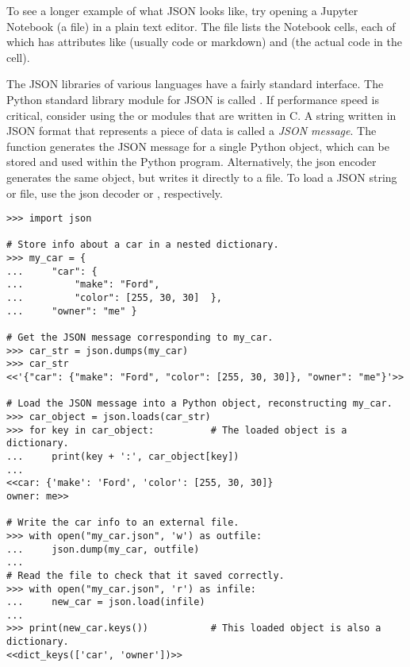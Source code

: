 \begin{info}
To see a longer example of what JSON looks like, try opening a Jupyter Notebook (a  file) in a plain text editor.
The file lists the Notebook cells, each of which has attributes like  (usually code or markdown) and  (the actual code in the cell).
\end{info}

The JSON libraries of various languages have a fairly standard interface.
The Python standard library module for JSON is called .
If performance speed is critical, consider using the  or  modules that are written in C.
A string written in JSON format that represents a piece of data is called a \emph{JSON message}.
The  function generates the JSON message for a single Python object, which can be stored and used within the Python program.
Alternatively, the json encoder  generates the same object, but writes it directly to a file.
To load a JSON string or file, use the json decoder  or , respectively.

\begin{lstlisting}
>>> import json

# Store info about a car in a nested dictionary.
>>> my_car = {
...     "car": {
...         "make": "Ford",
...         "color": [255, 30, 30]  },
...     "owner": "me" }

# Get the JSON message corresponding to my_car.
>>> car_str = json.dumps(my_car)
>>> car_str
<<'{"car": {"make": "Ford", "color": [255, 30, 30]}, "owner": "me"}'>>

# Load the JSON message into a Python object, reconstructing my_car.
>>> car_object = json.loads(car_str)
>>> for key in car_object:          # The loaded object is a dictionary.
...     print(key + ':', car_object[key])
...
<<car: {'make': 'Ford', 'color': [255, 30, 30]}
owner: me>>

# Write the car info to an external file.
>>> with open("my_car.json", 'w') as outfile:
...     json.dump(my_car, outfile)
...
# Read the file to check that it saved correctly.
>>> with open("my_car.json", 'r') as infile:
...     new_car = json.load(infile)
...
>>> print(new_car.keys())           # This loaded object is also a dictionary.
<<dict_keys(['car', 'owner'])>>
\end{lstlisting}

